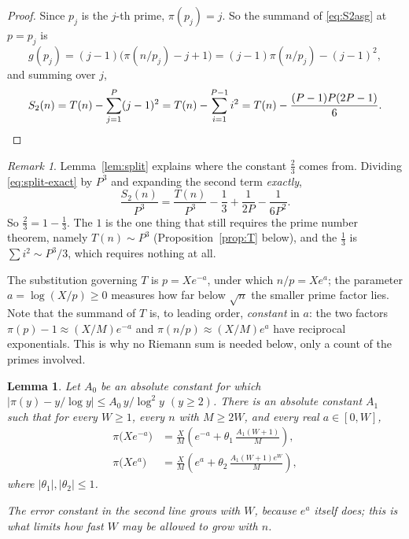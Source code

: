 \documentclass[a4paper,11pt,oneside,reqno]{amsart}
\theoremstyle{definition}
\theoremstyle{remark}
\newtheorem{remark}[definition]{Remark}
\theoremstyle{plain}
\newtheorem{lemma}[definition]{Lemma}
\begin{document}
\begin{proof}
  Since \(p_j\) is the \(j\)-th prime, \(\pi(p_j) = j\). So the summand of
  \eqref{eq:S2asg} at \(p = p_j\) is
  \[
    g(p_j) = (j-1)\bigl(\pi(n/p_j)-j+1\bigr) = (j-1)\pi(n/p_j)-(j-1)^{2},
  \]
  and summing over \(j\),
  \[
    S_2(n) = T(n)-\sum_{j = 1}^{P}(j-1)^{2}
          =T(n)-\sum_{i = 1}^{P-1}i^{2}
          =T(n)-\frac{(P-1)P(2P-1)}{6}. \qedhere
  \]
\end{proof}

\begin{remark}\label{rem:whytwothirds}
  Lemma~\ref{lem:split} explains where the constant \(\tfrac{2}{3}\) comes from.
  Dividing \eqref{eq:split-exact} by \(P^{3}\) and expanding the second term
  \emph{exactly},
  \begin{equation}\label{eq:sqexact}
    \frac{S_2(n)}{P^{3}} = \frac{T(n)}{P^{3}}-\frac{1}{3}+\frac 1{2P}-\frac 1{6P^{2}} .
  \end{equation}
  So \(\tfrac{2}{3} = 1-\tfrac{1}{3}\). The \(1\) is the one thing that still
  requires the prime number theorem, namely \(T(n) \sim P^{3}\)
  (Proposition~\ref{prop:T} below), and the \(\tfrac{1}{3}\) is
  \(\sum i^{2} \sim P^{3}/3\), which requires nothing at all.
\end{remark}

The substitution governing \(T\) is \(p = Xe^{-a}\), under which \(n/p = Xe^{a}\);
the parameter \(a = \log(X/p) \ge 0\) measures how far below \(\sqrt n\) the
smaller prime factor lies. Note that the summand of \(T\) is, to leading order,
\emph{constant} in \(a\): the two factors \(\pi(p)-1 \approx (X/M)e^{-a}\) and
\(\pi(n/p) \approx (X/M)e^{a}\) have reciprocal exponentials. This is why no
Riemann sum is needed below, only a count of the primes involved.

\begin{lemma}\label{lem:pnt-unif}
  Let \(A_0\) be an absolute constant for which
  \(|\pi(y)-y/\log y|\le A_0\,y/\log^{2}y\) \((y \ge 2)\). There is an absolute
  constant \(A_1\) such that for every \(W \ge 1\), every \(n\) with
  \(M \ge 2W\), and every real \(a \in [0,W]\),
  \begin{equation}\label{eq:pnt-sub}
    \begin{aligned}
      \pi\bigl(Xe^{-a}\bigr)
        &= \frac{X}{M}\left(e^{-a}+\theta_1\,\frac{A_1(W+1)}{M}\right),\\
      \pi\bigl(Xe^{a}\bigr)
        &= \frac{X}{M}\left(e^{a}+\theta_2\,\frac{A_1(W+1)e^{W}}{M}\right),
    \end{aligned}
  \end{equation}
  where \(|\theta_1|,|\theta_2|\le 1\).

  The error constant in the second line grows with \(W\), because \(e^{a}\)
  itself does; this is what limits how fast \(W\) may be allowed to grow with
  \(n\).
\end{lemma}
\end{document}
